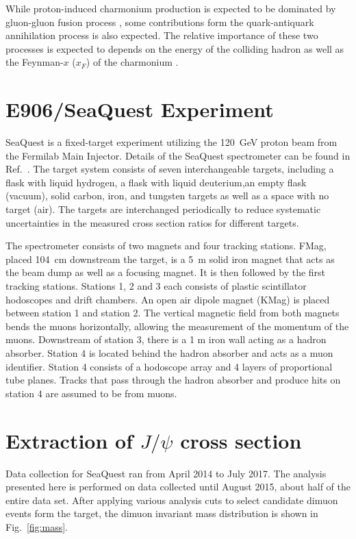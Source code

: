\documentclass[10pt, a4paper,final]{article}
\begin{document}
While proton-induced charmonium production is expected to be dominated by gluon-gluon
fusion process \cite{vogt1999}, some contributions form the quark-antiquark
annihilation process is also expected. The relative importance of these two
processes is expected to depends on the energy of the colliding hadron as well
as the Feynman-$x$ ($x_F$) of the charmonium \cite{peng1995}.


\section{E906/SeaQuest Experiment}
\label{sec:e906}
SeaQuest is a fixed-target experiment utilizing the \SI{120}{\GeV} proton beam
from the Fermilab Main Injector. Details of the SeaQuest spectrometer can be
found in Ref.~\cite{aidala2019}. The target system consists of seven
interchangeable targets, including a flask with liquid hydrogen, a flask with
liquid deuterium,an empty flask (vacuum), solid carbon, iron, and tungsten
targets as well as a space with no target (air). The targets are interchanged
periodically to reduce systematic uncertainties in the measured cross section
ratios for different targets.

The spectrometer consists of two magnets and four tracking stations. FMag,
placed \SI{104}{\cm} downstream the target, is a \SI{5}{\m} solid iron magnet
that acts as the beam dump as well as a focusing magnet. It is then followed by
the first tracking stations. Stations 1, 2 and 3 each consists of plastic
scintillator hodoscopes and drift chambers. An open air dipole magnet (KMag) is
placed between station 1 and station 2. The vertical magnetic field from both
magnets bends the muons horizontally, allowing the measurement of the momentum
of the muons. Downstream of station 3, there is a 1 m iron wall acting as a
hadron absorber. Station 4 is located behind the hadron absorber and acts as a
muon identifier. Station 4 consists of a hodoscope array and 4 layers of
proportional tube planes. Tracks that pass through the hadron absorber and
produce hits on station 4 are assumed to be from muons.

\section{Extraction of \texorpdfstring{$J/\psi$}{J/psi} cross section}
\label{sec:result}
Data collection for SeaQuest ran from April 2014 to July 2017. The analysis
presented here is performed on data collected until August 2015, about half
of the entire data set. After applying various analysis cuts to select
candidate dimuon events form the target, the dimuon invariant mass distribution
is shown in Fig.~\ref{fig:mass}.
\end{document}
